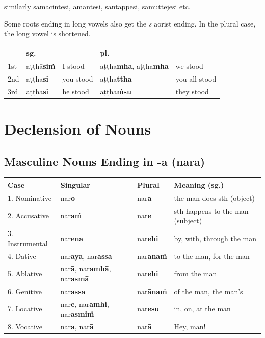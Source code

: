\documentclass[11pt,oneside]{memoir}
\begin{document}
similarly samacintesi, āmantesi, santappesi, samuttejesi etc.

Some roots ending in long vowels also get the \emph{s} aorist ending. In the plural case, the long vowel is shortened.

\begin{center}
\begin{tabular}{lllll}
 & \textbf{sg.} &  & \textbf{pl.} & \\[0pt]
\hline
1st & aṭṭhā\textbf{siṁ} & I stood & aṭṭha\textbf{mha}, aṭṭha\textbf{mhā} & we stood\\[0pt]
2nd & aṭṭhā\textbf{si} & you stood & aṭṭha\textbf{ttha} & you all stood\\[0pt]
3rd & aṭṭhā\textbf{si} & he stood & aṭṭha\textbf{ṁsu} & they stood\\[0pt]
\end{tabular}
\end{center}

\section{Declension of Nouns}
\label{sec:orgcb96513}

\clearpage

\subsection{Masculine Nouns Ending in -a (nara)}
\label{sec:orgb715a07}

\begin{center}
\begin{tabular}{llll}
Case & Singular & Plural & Meaning (sg.)\\[0pt]
\hline
1. Nominative & nar\textbf{o} & nar\textbf{ā} & the man does sth (object)\\[0pt]
2. Accusative & nar\textbf{aṁ} & nar\textbf{e} & sth happens to the man (subject)\\[0pt]
3. Instrumental & nar\textbf{ena} & nar\textbf{ehi} & by, with, through the man\\[0pt]
4. Dative & nar\textbf{āya}, nar\textbf{assa} & nar\textbf{ānaṁ} & to the man, for the man\\[0pt]
5. Ablative & nar\textbf{ā}, nar\textbf{amhā}, nar\textbf{asmā} & nar\textbf{ehi} & from the man\\[0pt]
6. Genitive & nar\textbf{assa} & nar\textbf{ānaṁ} & of the man, the man's\\[0pt]
7. Locative & nar\textbf{e}, nar\textbf{amhi}, nar\textbf{asmiṁ} & nar\textbf{esu} & in, on, at the man\\[0pt]
8. Vocative & nar\textbf{a}, nar\textbf{ā} & nar\textbf{ā} & Hey, man!\\[0pt]
\end{tabular}
\end{center}
\end{document}
